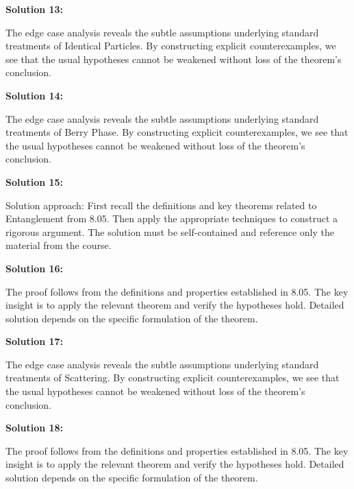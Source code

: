 \documentclass[12pt,a4paper]{exam}
\begin{document}
\vspace{0.5cm}

\textbf{Solution 13:}

The edge case analysis reveals the subtle assumptions underlying standard treatments of Identical Particles. By constructing explicit counterexamples, we see that the usual hypotheses cannot be weakened without loss of the theorem's conclusion.

\vspace{0.5cm}

\textbf{Solution 14:}

The edge case analysis reveals the subtle assumptions underlying standard treatments of Berry Phase. By constructing explicit counterexamples, we see that the usual hypotheses cannot be weakened without loss of the theorem's conclusion.

\vspace{0.5cm}

\textbf{Solution 15:}

Solution approach: First recall the definitions and key theorems related to Entanglement from 8.05. Then apply the appropriate techniques to construct a rigorous argument. The solution must be self-contained and reference only the material from the course.

\vspace{0.5cm}

\textbf{Solution 16:}

The proof follows from the definitions and properties established in 8.05. The key insight is to apply the relevant theorem and verify the hypotheses hold. Detailed solution depends on the specific formulation of the theorem.

\vspace{0.5cm}

\textbf{Solution 17:}

The edge case analysis reveals the subtle assumptions underlying standard treatments of Scattering. By constructing explicit counterexamples, we see that the usual hypotheses cannot be weakened without loss of the theorem's conclusion.

\vspace{0.5cm}

\textbf{Solution 18:}

The proof follows from the definitions and properties established in 8.05. The key insight is to apply the relevant theorem and verify the hypotheses hold. Detailed solution depends on the specific formulation of the theorem.
\end{document}
